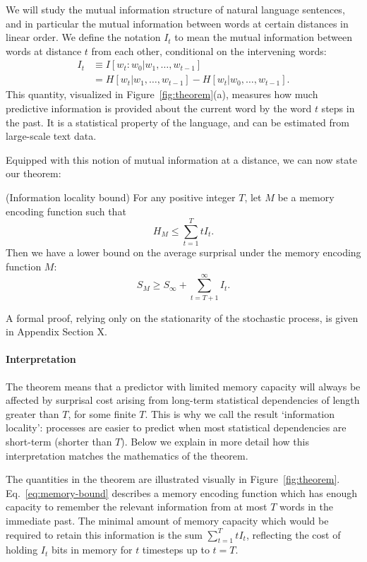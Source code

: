 We will study the mutual information structure of natural language sentences, and in particular the mutual information between words at certain distances in linear order. We define the notation $I_t$ to mean the mutual information between words at distance $t$ from each other, conditional on the intervening words:
\begin{align}
    \nonumber
    I_t &\equiv I[w_t : w_0 | w_1, \dots, w_{t-1}] \\
    \nonumber
    &= H[w_t | w_1, \dots, w_{t-1}] - H[w_t | w_0, \dots, w_{t-1}].
\end{align}
This quantity, visualized in Figure~\ref{fig:theorem}(a), measures how much predictive information is provided about the current word by the word $t$ steps in the past.
It is a statistical property of the language, and can be estimated from large-scale text data.

Equipped with this notion of mutual information at a distance, we can now state our theorem:
\begin{thm}\label{prop:suboptimal}(Information locality bound) For any positive integer $T$, let $M$ be a memory encoding function such that
\begin{equation}
\label{eq:memory-bound}
H_M \le \sum_{t=1}^T t I_t.    
\end{equation}
Then we have a lower bound on the average surprisal under the memory encoding function $M$:
\begin{equation}
\label{eq:surprisal-bound}
S_M \ge S_\infty + \sum_{t=T+1}^\infty I_t.
\end{equation}
\end{thm}
A formal proof, relying only on the stationarity of the stochastic process, is given in Appendix Section X. 

\paragraph{Interpretation} The theorem means that a predictor with limited memory capacity will always be affected by surprisal cost arising from long-term statistical dependencies of length greater than $T$, for some finite $T$. This is why we call the result `information locality': processes are easier to predict when most statistical dependencies are short-term (shorter than $T$). Below we explain in more detail how this interpretation matches the mathematics of the theorem.

The quantities in the theorem are illustrated visually in Figure~\ref{fig:theorem}. Eq.~\ref{eq:memory-bound} describes a memory encoding function which has enough capacity to remember the relevant information from at most $T$ words in the immediate past. The minimal amount of memory capacity which would be required to retain this information is the sum $\sum_{t=1}^T t I_t$, reflecting the cost of holding $I_t$ bits in memory for $t$ timesteps up to $t=T$. 

